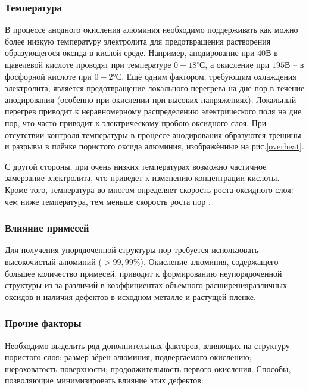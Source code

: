\subsubsection{Температура}

В процессе анодного окисления алюминия необходимо поддерживать как можно более низкую температуру электролита для предотвращения растворения образующегося оксида в кислой среде. Например, анодирование при $40\text{В}$ в щавелевой кислоте проводят при температуре $0-18^{\circ}С$, а окисление при $195\text{В}$ – в фосфорной кислоте при $0-2°С$. Ещё одним фактором, требующим охлаждения электролита, является предотвращение локального перегрева на дне пор в течение анодирования (особенно при окислении при высоких напряжениях). Локальный перегрев приводит к неравномерному распределению электрического поля на дне пор, что часто приводит к электрическому пробою оксидного слоя. При отсутствии контроля температуры в процессе анодирования образуются трещины и разрывы в плёнке пористого оксида алюминия, изображённые на рис.\ref{overheat}.

С другой стороны, при очень низких температурах возможно частичное замерзание электролита, что приведет к  изменению концентрации кислоты. Кроме того, температура во многом определяет скорость роста оксидного слоя: чем ниже температура, тем меньше скорость роста пор \cite{petukhov}.


\subsubsection{Влияние примесей}

Для получения упорядоченной структуры пор требуется использовать высокочистый алюминий ($>99,99\%$). Окисление алюминия, содержащего большее количество примесей, приводит к формированию неупорядоченной структуры из-за различий в коэффициентах объемного расширенияразличных оксидов и наличия дефектов в исходном металле и растущей пленке.

\subsubsection{Прочие факторы}

Необходимо выделить ряд дополнительных факторов, влияющих на структуру пористого слоя: размер зёрен алюминия, подвергаемого окислению; шероховатость поверхности; продолжительность первого окисления. Способы, позволяющие минимизировать влияние этих дефектов:

